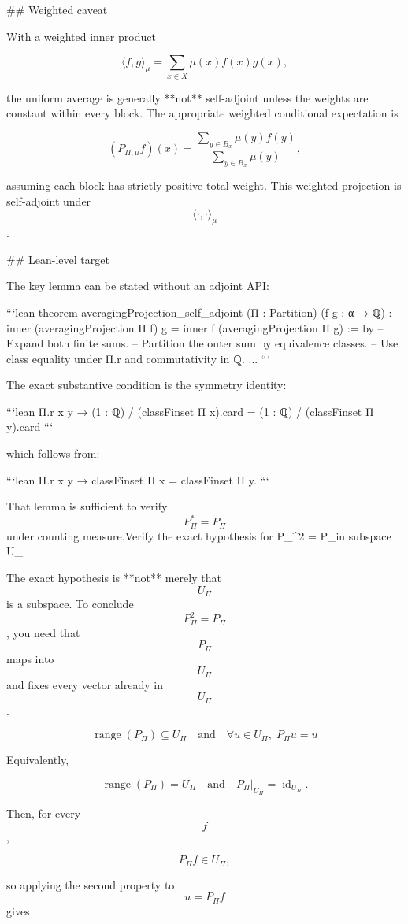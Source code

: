 ## Weighted caveat

With a weighted inner product

$$
\langle f,g\rangle_\mu
=
\sum_{x\in X}\mu(x)f(x)g(x),
$$

the uniform average is generally **not** self-adjoint unless the weights are constant within every block. The appropriate weighted conditional expectation is

$$
(P_{\Pi,\mu}f)(x)
=
\frac{\sum_{y\in B_x}\mu(y)f(y)}
{\sum_{y\in B_x}\mu(y)},
$$

assuming each block has strictly positive total weight. This weighted projection is self-adjoint under $$\langle\cdot,\cdot\rangle_\mu$$.

## Lean-level target

The key lemma can be stated without an adjoint API:

```lean
theorem averagingProjection_self_adjoint
    (Π : Partition) (f g : α → ℚ) :
    inner (averagingProjection Π f) g
      = inner f (averagingProjection Π g) := by
  -- Expand both finite sums.
  -- Partition the outer sum by equivalence classes.
  -- Use class equality under Π.r and commutativity in ℚ.
  ...
```

The exact substantive condition is the symmetry identity:

```lean
Π.r x y →
(1 : ℚ) / (classFinset Π x).card
  =
(1 : ℚ) / (classFinset Π y).card
```

which follows from:

```lean
Π.r x y → classFinset Π x = classFinset Π y.
```

That lemma is sufficient to verify $$P_\Pi^\ast=P_\Pi$$ under counting measure.Verify the exact hypothesis for P_\Pi^2 = P_\Pi in subspace U_\Pi

The exact hypothesis is **not** merely that $$U_\Pi$$ is a subspace. To conclude $$P_\Pi^2=P_\Pi$$, you need that $$P_\Pi$$ maps into $$U_\Pi$$ and fixes every vector already in $$U_\Pi$$.

$$
\boxed{
\operatorname{range}(P_\Pi)\subseteq U_\Pi
\quad\text{and}\quad
\forall u\in U_\Pi,\;P_\Pi u=u
}
$$

Equivalently,

$$
\boxed{
\operatorname{range}(P_\Pi)=U_\Pi
\quad\text{and}\quad
P_\Pi|_{U_\Pi}=\operatorname{id}_{U_\Pi}.
}
$$

Then, for every $$f$$,

$$
P_\Pi f\in U_\Pi,
$$

so applying the second property to $$u=P_\Pi f$$ gives


